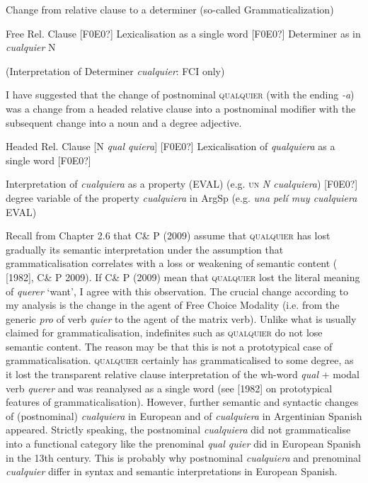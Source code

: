 \documentclass[output=paper]{langscibook}
\begin{document}
  Change from relative clause to a determiner (so-called Grammaticalization)

    Free Rel. Clause [F0E0?] Lexicalisation as a single word [F0E0?] Determiner as in \textit{cualquier} N

(Interpretation of Determiner \textit{cualquier}: FCI only)

I have suggested that the change of postnominal \textsc{qualquier} (with the ending \textit{{}-a}) was a change from a headed relative clause into a postnominal modifier with the subsequent change into a noun and a degree adjective.

  Headed Rel. Clause [N \textit{qual quiera}] [F0E0?] Lexicalisation of \textit{qualquiera} as a single word [F0E0?]

    Interpretation of \textit{cualquiera} as a property (EVAL) (e.g. \textsc{un} \textit{N cualquiera}) [F0E0?] degree variable of the property \textit{cualquiera} in ArgSp (e.g. \textit{una pelí muy cualquiera} EVAL)

Recall from Chapter 2.6 that C\& P (2009) assume that \textsc{qualquier} has lost gradually its semantic interpretation under the assumption that grammaticalisation correlates with a loss or weakening of semantic content (\citealt{Lehmann2002} [1982], C\& P 2009). If C\& P (2009) mean that \textsc{qualquier} lost the literal meaning of \textit{querer} ‘want’, I agree with this observation. The crucial change according to my analysis is the change in the agent of Free Choice Modality (i.e. from the generic \textit{pro} of verb \textit{quier} to the agent of the matrix verb). Unlike what is usually claimed for grammaticalisation, indefinites such as \textsc{qualquier} do not lose semantic content. The reason may be that this is not a prototypical case of grammaticalisation. \textsc{qualquier} certainly has grammaticalised to some degree, as it lost the transparent relative clause interpretation of the wh-word \textit{qual} + modal verb \textit{querer} and was reanalysed as a single word (see \citealt{Lehmann2002} [1982] on prototypical features of grammaticalisation). However, further semantic and syntactic changes of (postnominal) \textit{cualquiera} in European and of \textit{cualquiera} in Argentinian Spanish appeared. Strictly speaking, the postnominal \textit{cualquiera} did not grammaticalise into a functional category like the prenominal \textit{qual quier} did in European Spanish in the 13th century. This is probably why postnominal \textit{cualquiera} and prenominal \textit{cualquier} differ in syntax and semantic interpretations in European Spanish. 
\end{document}
